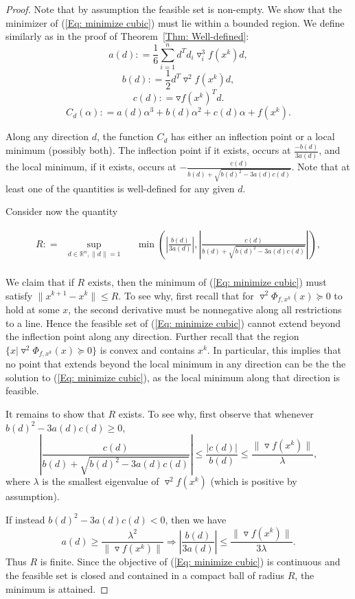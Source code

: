 \documentclass[11pt]{article}
\theoremstyle{plain}
\theoremstyle{definition}
\theoremstyle{remark}
\def \defeq{\mathrel{\mathop{:}}=}
\def \grad{\triangledown}
\def \Hess{\triangledown^2}
\def \R{\mathbb{R}}
\def \Rn{\R^n}
\begin{document}
\begin{proof}

Note that by assumption the feasible set is non-empty. We show that the minimizer of (\ref{Eq: minimize cubic}) must lie within a bounded region. We define similarly as in the proof of Theorem~\ref{Thm: Well-defined}:
$$a(d) \defeq \frac{1}{6}\sum_{i=1}^n d^T d_i \grad_i^3 f(x^k)d,$$
$$b(d) \defeq \frac{1}{2} d^T\Hess f(x^k)d,$$
$$c(d) \defeq \grad f(x^k)^Td.$$
$$C_{d}(\alpha) \defeq a(d)\alpha^3 + b(d)\alpha^2 + c(d)\alpha + f(x^k).$$

Along any direction $d$, the function $C_d$ has either an inflection point or a local minimum (possibly both). The inflection point if it exists, occurs at $\frac{-b(d)}{3a(d)}$, and the local minimum, if it exists, occurs at $-\frac{c(d)}{b(d) + \sqrt{b(d)^2 - 3 a(d)c(d)}}$. Note that at least one of the quantities is well-defined for any given $d$.

Consider now the quantity

\begin{equation}
    \begin{aligned}
	R \defeq& \underset{d \in \Rn, \|d\|=1}{\sup} 
	& & \min\left(\left|\frac{b(d)}{3a(d)}\right|, \left|\frac{c(d)}{b(d) + \sqrt{b(d)^2 - 3 a(d)c(d)}}\right|\right),\\
    \end{aligned}
\end{equation}

We claim that if $R$ exists, then the minimum of (\ref{Eq: minimize cubic}) must satisfy $\|x^{k+1} - x^k\| \le R$. To see why, first recall that for $\Hess \Phi_{f,x^k}(x) \succeq 0$ to hold at some $x$, the second derivative must be nonnegative along all restrictions to a line. Hence the feasible set of (\ref{Eq: minimize cubic}) cannot extend beyond the inflection point along any direction. Further recall that the region $\{x | \Hess \Phi_{f,x^k}(x) \succeq 0\}$ is convex and contains $x^k$. In particular, this implies that no point that extends beyond the local minimum in any direction can be the the solution to (\ref{Eq: minimize cubic}), as the local minimum along that direction is feasible.

It remains to show that $R$ exists. To see why, first observe that whenever $b(d)^2 - 3 a(d)c(d) \ge 0$,
$$\left|\frac{c(d)}{b(d) + \sqrt{b(d)^2 - 3 a(d)c(d)}}\right| \le \frac{|c(d)|}{b(d)} \le \frac{\|\grad f(x^k)\|}{\lambda},$$
where $\lambda$ is the smallest eigenvalue of $\Hess f(x^k)$ (which is positive by assumption).

If instead $b(d)^2 - 3 a(d)c(d) < 0$, then we have
$$a(d) \ge \frac{\lambda^2}{\|\grad f(x^k)\|} \Rightarrow \left|\frac{b(d)}{3a(d)}\right| \le \frac{\|\grad f(x^k)\|}{3\lambda}.$$
Thus $R$ is finite. Since the objective of (\ref{Eq: minimize cubic}) is continuous and the feasible set is closed and contained in a compact ball of radius $R$, the minimum is attained.
\end{proof}
\end{document}
